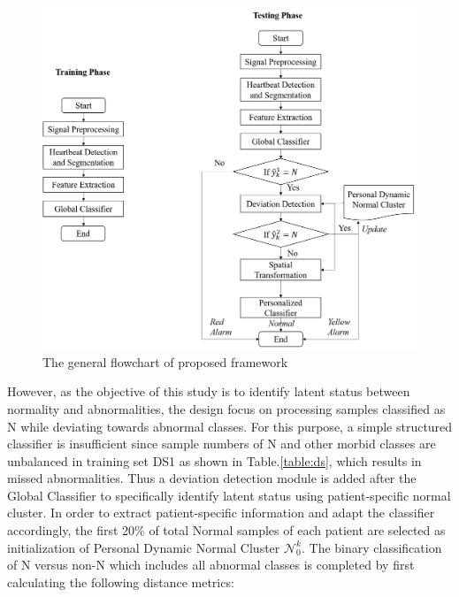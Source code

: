 \begin{figure}[ht]
	\centering
	\includegraphics[scale=.5]{Fig/flow2.png}
	\caption{The general flowchart of proposed framework}
	\label{fig:flow}
\end{figure}

However, as the objective of this study is to identify latent status between normality and abnormalities, the design focus on processing samples classified as N while deviating towards abnormal classes. For this purpose, a simple structured classifier is insufficient since sample numbers of N and other morbid classes are unbalanced in training set DS1 as shown in Table.\ref{table:ds}, which results in missed abnormalities. Thus a deviation detection module is added after the Global Classifier to specifically identify latent status using patient-specific normal cluster. In order to extract patient-specific information and adapt the classifier accordingly, the first 20\% of total Normal samples of each patient are selected as initialization of Personal Dynamic Normal Cluster $\mathcal{N}_0^k$. The binary classification of N versus non-N which includes all abnormal classes is completed by first calculating the following distance metrics:

